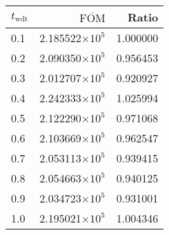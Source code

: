 \begin{tabular}{lrr}
\toprule
$t_{\mathrm{wdt}}$ & $\overline{\mathrm{FOM}}$ &    Ratio \\
\midrule
               0.1 &   2.185522$\times 10^{5}$ & 1.000000 \\
               0.2 &   2.090350$\times 10^{5}$ & 0.956453 \\
               0.3 &   2.012707$\times 10^{5}$ & 0.920927 \\
               0.4 &   2.242333$\times 10^{5}$ & 1.025994 \\
               0.5 &   2.122290$\times 10^{5}$ & 0.971068 \\
               0.6 &   2.103669$\times 10^{5}$ & 0.962547 \\
               0.7 &   2.053113$\times 10^{5}$ & 0.939415 \\
               0.8 &   2.054663$\times 10^{5}$ & 0.940125 \\
               0.9 &   2.034723$\times 10^{5}$ & 0.931001 \\
               1.0 &   2.195021$\times 10^{5}$ & 1.004346 \\
\bottomrule
\end{tabular}
